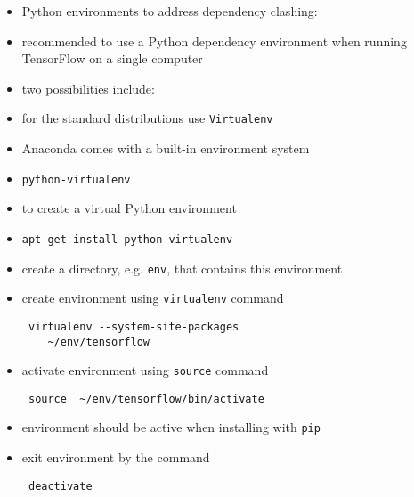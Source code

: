 \documentclass[twocolumn]{IEEEtran} %
\begin{document}
\begin{itemize}
    \ei
    \item Python environments to address dependency clashing:
    \bi
        \item recommended to use a Python dependency environment when running TensorFlow on a single computer
        \item two possibilities include:
        \bi
            \item for the standard distributions use \verb|Virtualenv|
            \item Anaconda comes with a built-in environment system
        \ei
    \ei
    \item \verb|python-virtualenv|
    \bi
        \item to create a virtual Python environment
        \item \verb|apt-get install python-virtualenv|
        \item create a directory, e.g. \verb|env|, that contains this environment
        \item create environment using \verb|virtualenv| command
 \begin{verbatim}
 virtualenv --system-site-packages
    ~/env/tensorflow
 \end{verbatim}
        \item activate environment using \verb|source| command
 \begin{verbatim}
 source  ~/env/tensorflow/bin/activate
 \end{verbatim}
        \item environment should be active when installing with \verb|pip|
        \item exit environment by the command
 \begin{verbatim}
 deactivate
 \end{verbatim}
    \ei
\end{itemize}



\newpage
\end{document}
